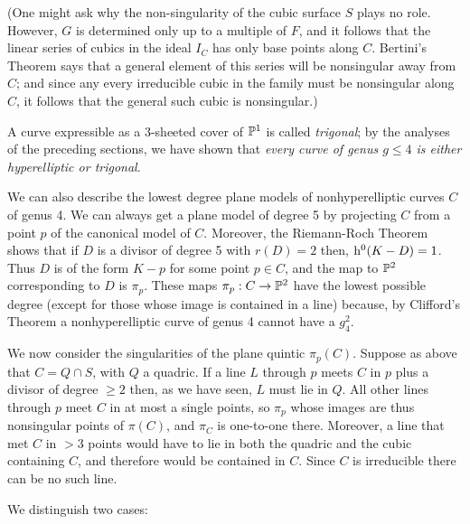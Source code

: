  (One might ask why the non-singularity of the cubic surface $S$ plays no role. However, $G$ is determined only up to a multiple of $F$, and it follows that the linear series of cubics in the ideal
$I_C$ has only base points along $C$. Bertini's Theorem says that a general element of this series will be nonsingular away from $C$; and since any every irreducible cubic in the family must be nonsingular along $C$, it follows that the general such cubic is nonsingular.)

A curve expressible as a 3-sheeted cover of $\PP^1$ is called \emph{trigonal}; by the analyses of the preceding sections, we have shown that \emph{every curve of genus $g \leq 4$ is either hyperelliptic or trigonal}. 

We can also describe the lowest degree plane models of nonhyperelliptic curves $C$ of genus 4. 
We can always get a plane model of degree 5 by projecting $C$ from a point $p$ of the canonical model of $C$. Moreover, the Riemann-Roch Theorem shows that if $D$ is a divisor of degree 5 with $r(D)=2$ then,  $\h^0(K-D) = 1$. Thus $D$ is of the form $K-p$ for some point $p \in C$, and the map to $\PP^2$ corresponding to $D$ is $\pi_p$. These  maps $\pi_p: C\to \PP^2$ have the lowest possible degree (except for those whose image is  contained in a line) because, by Clifford's Theorem a nonhyperelliptic curve of genus 4 cannot have a $g^2_4$.

We now consider the singularities of the plane quintic $\pi_p(C)$. Suppose as above that $C = Q\cap S$, with $Q$ a quadric. If a line $L$ through $p$ meets $C$ in $p$ plus a divisor of degree $\geq 2$ then, as we have seen, $L$ must lie in $Q$.  All other lines through $p$ meet $C$ in at most a single points, so $\pi_p$ whose images are thus nonsingular points of $\pi(C)$, and $\pi_C$ is one-to-one there. Moreover, a line that met $C$ in $>3$ points would have to lie in both the quadric and the cubic containing $C$, and therefore would be contained in $C$. Since $C$ is irreducible there can be no such line.

We distinguish two cases:

